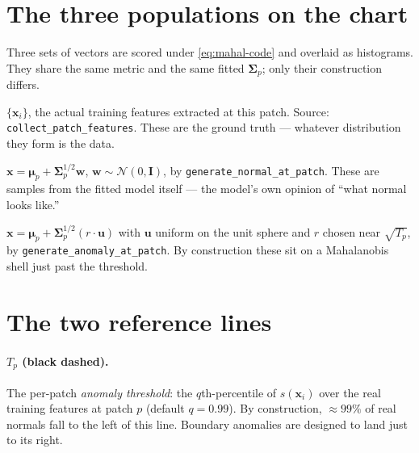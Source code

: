 \documentclass[11pt]{article}
\newcommand{\code}[1]{\texttt{#1}}
\newcommand{\bmu}{\boldsymbol{\mu}}
\newcommand{\bSigma}{\boldsymbol{\Sigma}}
\begin{document}
\section{The three populations on the chart}

Three sets of vectors are scored under \eqref{eq:mahal-code} and overlaid as
histograms. They share the same metric and the same fitted $\bSigma_p$; only
their construction differs.

\begin{description}[itemsep=2pt]
  \item[\textbf{Real normals} (blue).] $\{\mathbf{x}_i\}$, the actual training
    features extracted at this patch. Source: \code{collect\_patch\_features}.
    These are the ground truth --- whatever distribution they form is the data.
  \item[\textbf{Gaussian draws} (orange).] $\mathbf{x} = \bmu_p +
    \bSigma_p^{1/2}\mathbf{w}$, $\mathbf{w} \sim \mathcal{N}(0,\mathbf{I})$, by
    \code{generate\_normal\_at\_patch}. These are samples from the fitted model
    itself --- the model's own opinion of ``what normal looks like.''
  \item[\textbf{Boundary anomalies} (red).] $\mathbf{x} = \bmu_p +
    \bSigma_p^{1/2}(r\cdot\mathbf{u})$ with $\mathbf{u}$ uniform on the unit
    sphere and $r$ chosen near $\sqrt{T_p}$, by
    \code{generate\_anomaly\_at\_patch}. By construction these sit on a
    Mahalanobis shell just past the threshold.
\end{description}

\section{The two reference lines}

\paragraph{$T_p$ (black dashed).}
The per-patch \emph{anomaly threshold}: the $q$th-percentile of $s(\mathbf{x}_i)$
over the real training features at patch $p$ (default $q = 0.99$). By
construction, $\approx 99\%$ of real normals fall to the left of this line.
Boundary anomalies are designed to land just to its right.
\end{document}
